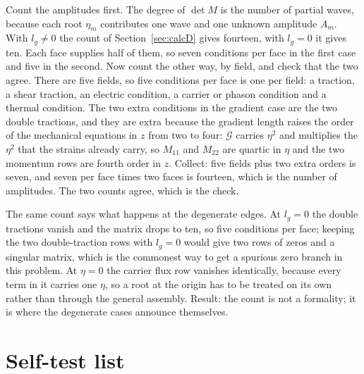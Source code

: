 \documentclass[11pt]{article}
\makeatletter
\newif\ifshowworked
\newenvironment{worked}{%
  \ifshowworked\par\smallskip\noindent\textit{Working.}\par\smallskip\else
  \setbox\z@\vbox\bgroup\fi}{\ifshowworked\par\smallskip\else\egroup\fi}
\newcommand{\Gcal}{\mathcal{G}}
\makeatother
\begin{document}
\begin{worked}
Count the amplitudes first. The degree of $\det M$ is the number of partial waves, because each root
$\eta_m$ contributes one wave and one unknown amplitude $A_m$. With $l_g\ne0$ the count of
Section~\ref{sec:calcD} gives fourteen, with $l_g=0$ it gives ten. Each face supplies half of them, so
seven conditions per face in the first case and five in the second.
Now count the other way, by field, and check that the two agree. There are five fields, so five conditions
per face is one per field: a traction, a shear traction, an electric condition, a carrier or phason
condition and a thermal condition. The two extra conditions in the gradient case are the two double
tractions, and they are extra because the gradient length raises the order of the mechanical equations in
$z$ from two to four: $\Gcal$ carries $\eta^2$ and multiplies the $\eta^2$ that the strains already carry,
so $M_{11}$ and $M_{22}$ are quartic in $\eta$ and the two momentum rows are fourth order in $z$.
Collect: five fields plus two extra orders is seven, and seven per face times two faces is fourteen, which
is the number of amplitudes. The two counts agree, which is the check.
\end{worked}

\begin{worked}
The same count says what happens at the degenerate edges. At $l_g=0$ the double tractions vanish and the
matrix drops to ten, so five conditions per face; keeping the two double-traction rows with $l_g=0$ would
give two rows of zeros and a singular matrix, which is the commonest way to get a spurious zero branch in
this problem. At $\eta=0$ the carrier flux row vanishes identically, because every term in it carries one
$\eta$, so a root at the origin has to be treated on its own rather than through the general assembly.
Result: the count is not a formality; it is where the degenerate cases announce themselves.
\end{worked}

\section{Self-test list}\label{sec:selftest}
\end{document}
